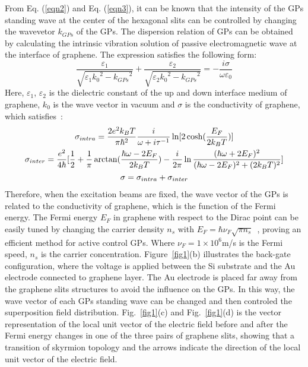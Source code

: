 \documentclass{optica-article}
\begin{document}
From Eq. (\ref{eqn2}) and Eq. (\ref{eqn3}), it can be known that the intensity of the GPs standing wave at the center of the hexagonal slits can be controlled by changing the wavevetor $k_{GPs}$ of the GPs. The dispersion relation of GPs can be obtained by calculating the intrinsic vibration solution of passive electromagnetic wave at the interface of graphene. The expression satisfies the following form:
\begin{equation}
\frac{\varepsilon_{1}}{\sqrt{\varepsilon_{1}{k_{0}}^{2}-{k_{GPs}}^{2}}}+\frac{\varepsilon_{2}}{\sqrt{\varepsilon_{2}{k_{0}}^{2}-{k_{GPs}}^{2}}}=-\frac{i\sigma}{\omega\varepsilon_{0}}
\label{eqn4}
\end{equation}
Here, $\varepsilon_{1}$, $\varepsilon_{2}$ is the dielectric constant of the up and down interface medium of graphene, $k_{0}$ is the wave vector in vacuum and $\sigma$ is the conductivity of graphene, which satisfies~\cite{nikitin2011fields12}:
\begin{gather}
\sigma_{intra}=\frac{2e^{2}k_{B}T}{\pi{\hbar}^{2}} \frac{i}{\omega+i{\tau}^{-1}} \ln[2\cosh(\frac{E_{F}}{2k_{B}T})]   \notag\\
 \sigma_{inter}=\frac{e^{2}}{4\hbar} [\frac{1}{2}+\frac{1}{\pi}\arctan(\frac{\hbar\omega-2E_{F}}{2k_{B}T})-\frac{i}{2\pi}\ln{\frac{(\hbar\omega+2E_{F})^{2}}{(\hbar\omega-2E_{F})^{2}+(2k_{B}T)^{2}}}]       \notag\\
\sigma=\sigma_{intra}+\sigma_{inter}    
\label{eqn5}
\end{gather}
Therefore, when the excitation beams are fixed, the wave vector of the GPs is related to the conductivity of graphene, which is the function of the Fermi energy. The Fermi energy $E_{F}$ in graphene with respect to the Dirac point can be easily tuned by changing the carrier density $n_{s}$ with $E_{F}=\hbar{\nu_{F}}\sqrt{\pi{n_{s}}}$~\cite{RN13, RN14}, proving an efficient method for active control GPs. Where $\nu_{F}=1\times{10}^{6}$m/s is the Fermi speed, $n_{s}$ is the carrier concentration. Figure~\ref{fig1}(b) illustrates the back-gate configuration, where the voltage is applied between the Si substrate and the Au electrode connected to graphene layer. The Au electrode is placed far away from the graphene slits structures to avoid the influence on the GPs. In this way, the wave vector of each GPs standing wave can be changed and then controled the superposition field distribution. Fig.~\ref{fig1}(c) and Fig.~\ref{fig1}(d) is the vector representation of the local unit vector of the electric field before and after the Fermi energy changes in one of the three pairs of graphene slits, showing that a transition of skyrmion topology and the arrows indicate the direction of the local unit vector of the electric field.
\end{document}
